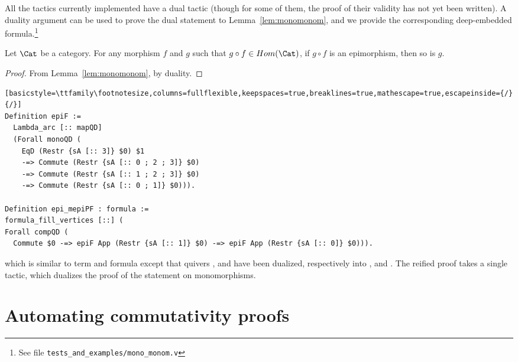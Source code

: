 All the tactics currently implemented have a dual tactic (though for some of them, the proof of their validity has not yet been written). A duality argument can be used to prove the dual statement to Lemma~\ref{lem:monomonom}, and we provide the corresponding deep-embedded formula.\footnote{See file \texttt{tests\_and\_examples/mono\_monom.v}}

\begin{lemma}\label{lem:epimepi}
  Let $\Cat$ be a category. For any morphism $f$ and $g$ such that $g \circ f \in Hom(\Cat)$, if $g \circ f$ is an epimorphism, then so is $g$.
\end{lemma}

\begin{proof}
From Lemma~\ref{lem:monomonom}, by duality.
\end{proof}

\begin{lstlisting}[basicstyle=\ttfamily\footnotesize,columns=fullflexible,keepspaces=true,breaklines=true,mathescape=true,escapeinside={/}{/}]
Definition epiF :=
  Lambda_arc [:: mapQD]
  (Forall monoQD (
    EqD (Restr {sA [:: 3]} $0) $1
    -=> Commute (Restr {sA [:: 0 ; 2 ; 3]} $0)
    -=> Commute (Restr {sA [:: 1 ; 2 ; 3]} $0)
    -=> Commute (Restr {sA [:: 0 ; 1]} $0))).

Definition epi_mepiPF : formula :=
formula_fill_vertices [::] (
Forall compQD (
  Commute $0 -=> epiF App (Restr {sA [:: 1]} $0) -=> epiF App (Restr {sA [:: 0]} $0))).
\end{lstlisting}
which is similar to term  and formula  except that quivers ,  and   have been dualized, respectively into ,  and . The reified proof takes a single tactic, which dualizes the proof of the statement on monomorphisms.





\section{Automating commutativity proofs}\label{sec:autocom}

